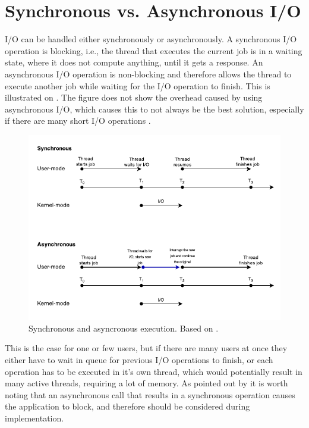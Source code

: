 

\section{Synchronous vs. Asynchronous I/O}
I/O can be handled either synchronously or asynchronously. A synchronous I/O operation is blocking, i.e., the thread that executes the current job is in a waiting state, where it does not compute anything, until it gets a response. An asynchronous I/O operation is non-blocking and therefore allows the thread to execute another job while waiting for the I/O operation to finish. This is illustrated on . The figure does not show the overhead caused by using asynchronous I/O, which causes this to not always be the best solution, especially if there are many short I/O operations \cite{ms-syn-asyn}.

\begin{figure}[H]
  \centering
  \includegraphics[scale=1.2]{billeder/sync-async.pdf}  
  \caption{Synchronous and asyncronous execution. Based on \cite{ms-syn-asyn}.}
  \label{fig:syncasync}
\end{figure}

This is the case for one or few users, but if there are many users at once they either have to wait in queue for previous I/O operations to finish, or each operation has to be executed in it's own thread, which would potentially result in many active threads, requiring a lot of memory. As pointed out by \citet{amir} it is worth noting that an asynchronous call that results in a synchronous operation causes the application to block, and therefore should be considered during implementation.

